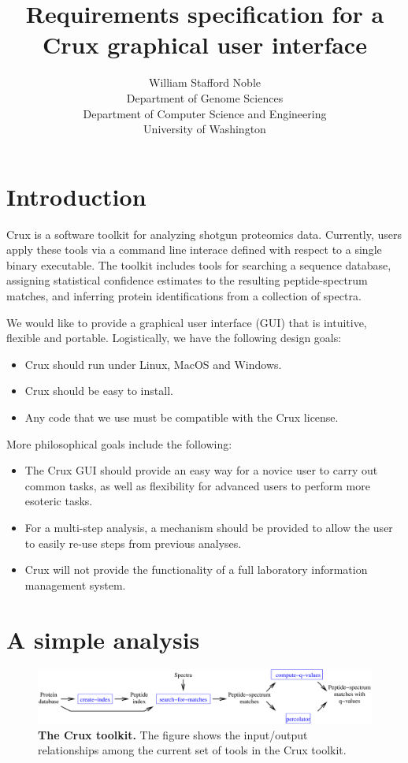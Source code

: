 \documentclass{article}
\title{Requirements specification for a Crux graphical user interface}
\author{William Stafford Noble\\
Department of Genome Sciences\\
Department of Computer Science and Engineering\\
University of Washington}
\begin{document}
\maketitle

\section{Introduction}

Crux is a software toolkit for analyzing shotgun proteomics data.
Currently, users apply these tools via a command line interace defined
with respect to a single binary executable.  The toolkit includes
tools for searching a sequence database, assigning statistical
confidence estimates to the resulting peptide-spectrum matches, and
inferring protein identifications from a collection of spectra.

We would like to provide a graphical user interface (GUI) that is
intuitive, flexible and portable.  Logistically, we have the following
design goals:
\begin{itemize}
\item Crux should run under Linux, MacOS and Windows.
\item Crux should be easy to install.
\item Any code that we use must be compatible with the Crux license.
\end{itemize}
More philosophical goals include the following:
\begin{itemize}
\item The Crux GUI should provide an easy way for a novice user to
  carry out common tasks, as well as flexibility for advanced users to
  perform more esoteric tasks.
\item For a multi-step analysis, a mechanism should be provided to
  allow the user to easily re-use steps from previous analyses.
\item Crux will not provide the functionality of a full laboratory
  information management system.
\end{itemize}

\section{A simple analysis}

\begin{figure}
\centering
\includegraphics[width=6in]{schematic.eps}
\caption{{\bf The Crux toolkit.}  The figure shows the input/output
  relationships among the current set of tools in the Crux toolkit.
  \label{figure:schematic}}
\end{figure}
\end{document}
